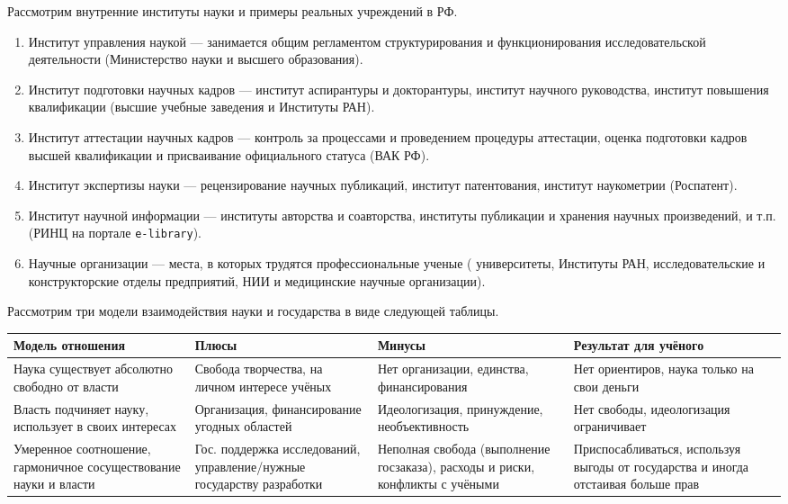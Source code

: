 Рассмотрим внутренние институты науки и примеры реальных учреждений в РФ.
\begin{enumerate}
\item Институт управления наукой --- занимается общим регламентом структурирования и функционирования исследовательской деятельности (Министерство науки и высшего образования).

\item Институт подготовки научных кадров --- институт аспирантуры и
докторантуры, институт научного руководства, институт повышения квалификации (высшие учебные заведения и Институты РАН). 

\item Институт аттестации научных кадров --- контроль за процессами и проведением процедуры аттестации, оценка подготовки кадров высшей квалификации и присваивание официального статуса 
(ВАК РФ). 

\item Институт экспертизы науки --- рецензирование научных публикаций, институт
патентования, институт наукометрии (Роспатент).

\item Институт научной информации --- институты авторства и соавторства, институты
публикации и хранения научных произведений, и т.п. (РИНЦ на портале \texttt{e-library}). 

\item Научные организации --- места, в которых трудятся профессиональные ученые (
университеты, Институты РАН, исследовательские и конструкторские отделы предприятий, НИИ и
медицинские научные организации).
\end{enumerate}

Рассмотрим три модели взаимодействия науки и государства в виде следующей таблицы. 

\begin{table}[H]
\centering
\begin{tabular}{|p{4cm}|p{4cm}|p{4cm}|p{4cm}|}
\hline
\textbf{Модель отношения} &
\textbf{Плюсы} &
\textbf{Минусы} &
\textbf{Результат для учёного} \\ \hline
Наука существует абсолютно свободно от власти &
Свобода творчества, на личном интересе учёных &
Нет организации, единства, финансирования &
Нет ориентиров, наука только на свои деньги \\ \hline
Власть подчиняет науку, использует в своих интересах &
Организация, финансирование угодных областей &
Идеологизация, принуждение, необъективность &
Нет свободы, идеологизация ограничивает \\ \hline
Умеренное соотношение, гармоничное сосуществование науки и власти &
Гос. поддержка исследований, управление/нужные государству разработки &
Неполная свобода (выполнение госзаказа), расходы и риски, конфликты с учёными &
Приспосабливаться, используя выгоды от государства и иногда отстаивая больше прав \\ \hline
\end{tabular}
\label{table:science_and_power}
\end{table}

